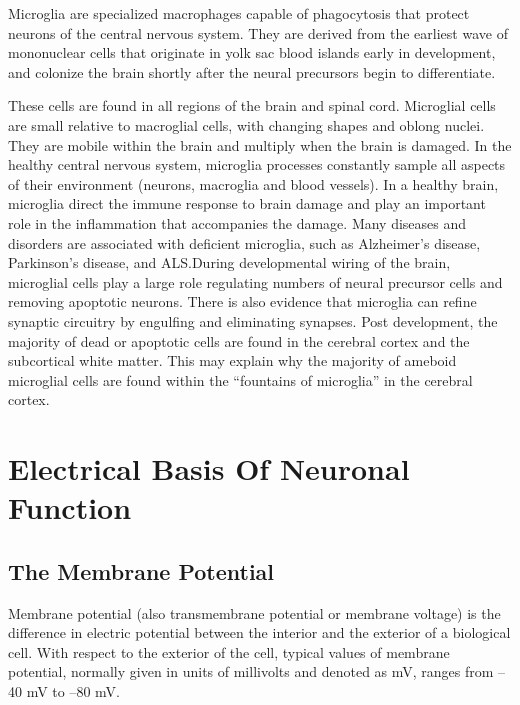 Microglia are specialized macrophages capable of phagocytosis that protect neurons of the central nervous system. They are derived from the earliest wave of mononuclear cells that originate in yolk sac blood islands early in development, and colonize the brain shortly after the neural precursors begin to differentiate.

These cells are found in all regions of the brain and spinal cord. Microglial cells are small relative to macroglial cells, with changing shapes and oblong nuclei. They are mobile within the brain and multiply when the brain is damaged. In the healthy central nervous system, microglia processes constantly sample all aspects of their environment (neurons, macroglia and blood vessels). In a healthy brain, microglia direct the immune response to brain damage and play an important role in the inflammation that accompanies the damage. Many diseases and disorders are associated with deficient microglia, such as Alzheimer's disease, Parkinson's disease, and ALS.During developmental wiring of the brain, microglial cells play a large role regulating numbers of neural precursor cells and removing apoptotic neurons. There is also evidence that microglia can refine synaptic circuitry by engulfing and eliminating synapses. Post development, the majority of dead or apoptotic cells are found in the cerebral cortex and the subcortical white matter. This may explain why the majority of ameboid microglial cells are found within the ``fountains of microglia'' in the cerebral cortex.

\hypertarget{electrical-basis-of-neuronal-function}{%
\chapter{Electrical Basis Of Neuronal Function}\label{electrical-basis-of-neuronal-function}}

\hypertarget{the-membrane-potential}{%
\section{The Membrane Potential}\label{the-membrane-potential}}

Membrane potential (also transmembrane potential or membrane voltage) is the difference in electric potential between the interior and the exterior of a biological cell. With respect to the exterior of the cell, typical values of membrane potential, normally given in units of millivolts and denoted as mV, ranges from --40 mV to --80 mV.

